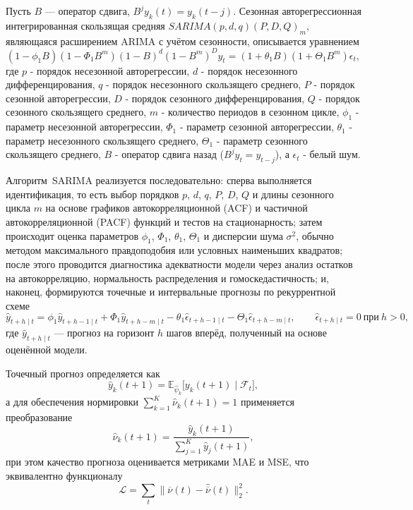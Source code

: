 \documentclass[14pt,a4paper]{article}
\begin{document}
Пусть $B$ — оператор сдвига, $B^j y_k(t)=y_k(t-j)$. Сезонная авторегрессионная интегрированная скользящая средняя $SARIMA(p,d,q)(P,D,Q)_m$, являющаяся расширением ARIMA с учётом сезонности, описывается уравнением
\[
(1-\phi_1 B)(1-\Phi_1 B^m)(1-B)^d(1-B^m)^D y_t = (1+\theta_1 B)(1+\Theta_1 B^m)\epsilon_t,
\]
где $p$ - порядок несезонной авторегрессии, $d$ - порядок несезонного дифференцирования, $q$ - порядок несезонного скользящего среднего, $P$ - порядок сезонной авторегрессии, $D$ - порядок сезонного дифференцирования, $Q$ - порядок сезонного скользящего среднего, $m$ - количество периодов в сезонном цикле, $\phi_1$ - параметр несезонной авторегрессии, $\Phi_1$ - параметр сезонной авторегрессии, $\theta_1$ - параметр несезонного скользящего среднего, $\Theta_1$ - параметр сезонного скользящего среднего, $B$ - оператор сдвига назад ($B^j y_t = y_{t-j}$), а $\epsilon_t$ - белый шум.

Алгоритм~SARIMA реализуется последовательно: сперва выполняется идентификация, то есть выбор порядков $p$, $d$, $q$, $P$, $D$, $Q$ и длины сезонного цикла $m$ на основе графиков автокорреляционной (ACF) и частичной автокорреляционной (PACF) функций и тестов на стационарность; затем происходит оценка параметров $\phi_1$, $\Phi_1$, $\theta_1$, $\Theta_1$ и дисперсии шума $\sigma^{2}$, обычно методом максимального правдоподобия или условных наименьших квадратов; после этого проводится диагностика адекватности модели через анализ остатков на автокорреляцию, нормальность распределения и гомоскедастичность; и, наконец, формируются точечные и интервальные прогнозы по рекуррентной схеме
\[
\hat{y}_{t+h\mid t}= \phi_1\hat{y}_{t+h-1\mid t}+ \Phi_1\hat{y}_{t+h-m\mid t}-\theta_1\hat{\epsilon}_{t+h-1\mid t}-\Theta_1\hat{\epsilon}_{t+h-m\mid t},
\qquad \hat{\epsilon}_{t+h\mid t}=0\ \text{при}\ h>0,
\]
где $\hat{y}_{t+h\mid t}$ — прогноз на горизонт $h$ шагов вперёд, полученный на основе оценённой модели.

Точечный прогноз определяется как
\[
\widehat{y}_k(t+1)=\mathbb{E}_{\widehat{\psi}_k}\bigl[y_k(t+1)\mid\mathcal F_t\bigr],
\]
а для обеспечения нормировки $\sum_{k=1}^{K}\widehat{\nu}_k(t+1)=1$ применяется преобразование
\[
\widehat{\nu}_k(t+1)=\frac{\widehat{y}_k(t+1)}{\sum_{j=1}^{K}\widehat{y}_j(t+1)},
\]
при этом качество прогноза оценивается метриками MAE и MSE, что эквивалентно функционалу
\[
\mathcal{L}=\sum_{t}\|\overline{\nu}(t)-\widehat{\overline{\nu}}(t)\|_2^2.
\]
\end{document}
